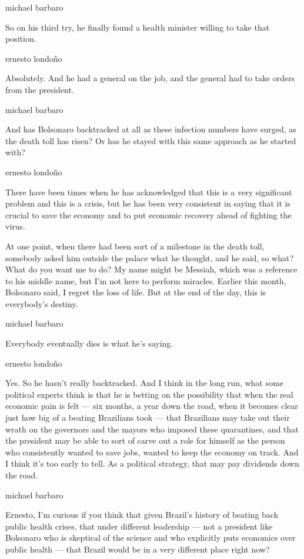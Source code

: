 michael barbaro

So on his third try, he finally found a health minister willing to take
that position.

ernesto londoño

Absolutely. And he had a general on the job, and the general had to take
orders from the president.

michael barbaro

And has Bolsonaro backtracked at all as these infection numbers have
surged, as the death toll has risen? Or has he stayed with this same
approach as he started with?

ernesto londoño

There have been times when he has acknowledged that this is a very
significant problem and this is a crisis, but he has been very
consistent in saying that it is crucial to save the economy and to put
economic recovery ahead of fighting the virus.

At one point, when there had been sort of a milestone in the death toll,
somebody asked him outside the palace what he thought, and he said, so
what? What do you want me to do? My name might be Messiah, which was a
reference to his middle name, but I'm not here to perform miracles.
Earlier this month, Bolsonaro said, I regret the loss of life. But at
the end of the day, this is everybody's destiny.

michael barbaro

Everybody eventually dies is what he's saying.

ernesto londoño

Yes. So he hasn't really backtracked. And I think in the long run, what
some political experts think is that he is betting on the possibility
that when the real economic pain is felt --- six months, a year down the
road, when it becomes clear just how big of a beating Brazilians took
--- that Brazilians may take out their wrath on the governors and the
mayors who imposed these quarantines, and that the president may be able
to sort of carve out a role for himself as the person who consistently
wanted to save jobs, wanted to keep the economy on track. And I think
it's too early to tell. As a political strategy, that may pay dividends
down the road.

michael barbaro

Ernesto, I'm curious if you think that given Brazil's history of beating
back public health crises, that under different leadership --- not a
president like Bolsonaro who is skeptical of the science and who
explicitly puts economics over public health --- that Brazil would be in
a very different place right now?

